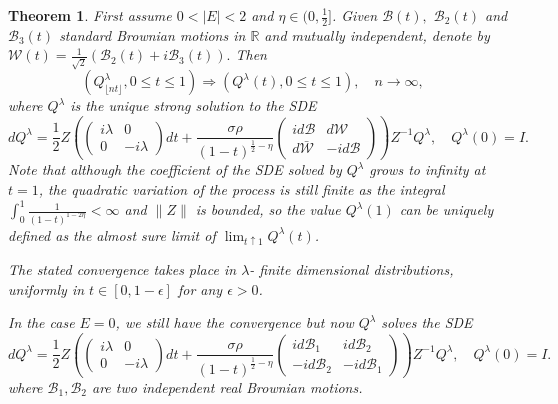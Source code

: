 \documentclass[12pt, reqno]{amsart}
\newtheorem{theorem}{Theorem}[section]
\theoremstyle{definition}
\theoremstyle{remark}
\numberwithin{equation}{section}
\begin{document}
\begin{theorem}\label{convergence2.1}
First assume $0<|E|<2$ and $\eta\in(0,\frac{1}{2}]$. Given $\mathcal{B}(t),$ $\mathcal{B}_2(t)$ and $\mathcal{B}_3(t)$ standard Brownian motions in $\mathbb{R}$ and mutually independent, denote by $\mathcal{W}(t)=\frac{1}{\sqrt{2}}(\mathcal{B}_2(t)+i\mathcal{B}_3(t)).$ Then 
$$(Q^\lambda_{\lfloor nt\rfloor},0\leq t\leq 1)\Rightarrow (Q^\lambda(t),0\leq t\leq 1),\quad n\to\infty,\quad $$
where $Q^\lambda$ is the unique strong solution to the SDE
\begin{equation}\label{noisecoefficientofQ}
    dQ^\lambda=\frac{1}{2}Z\left(\begin{pmatrix} i\lambda&0\\0&-i\lambda\end{pmatrix} dt+\frac{\sigma\rho}{(1-t)^{\frac{1}{2}-\eta}}\begin{pmatrix}
        id\mathcal{B}& d\mathcal{W}\\d\bar{\mathcal{W}}&-id\mathcal{B} \end{pmatrix}\right)Z^{-1}Q^\lambda,\quad Q^\lambda(0)=I.
\end{equation}
Note that although the coefficient of the SDE solved by $Q^\lambda$ grows to infinity at $t=1$, the quadratic variation of the process is still finite as the integral $\int_0^1\frac{1}{(1-t)^{1-2\eta}}<\infty$ and $\|Z\|$ is bounded, so the value $Q^\lambda(1)$ can be uniquely defined as the almost sure limit of $\lim_{t\uparrow 1}Q^\lambda(t)$.

The stated convergence takes place in $\lambda$- finite dimensional distributions, uniformly in $t\in[0,1-\epsilon]$ for any $\epsilon>0$. 

In the case $E=0$, we still have the convergence but now $Q^\lambda$ solves the SDE
\begin{equation}
\label{equationQlambda}dQ^\lambda=\frac{1}{2}Z\left(\begin{pmatrix} i\lambda&0\\0&-i\lambda\end{pmatrix} dt+\frac{\sigma\rho}{(1-t)^{\frac{1}{2}-\eta}}\begin{pmatrix}
        id\mathcal{B}_1& id\mathcal{B}_2\\-id\mathcal{B}_2&-id\mathcal{B}_1 \end{pmatrix}\right)Z^{-1}Q^\lambda,\quad Q^\lambda(0)=I.
\end{equation}
where $\mathcal{B}_1,\mathcal{B}_2$ are two independent real Brownian motions.
\end{theorem}
\end{document}
